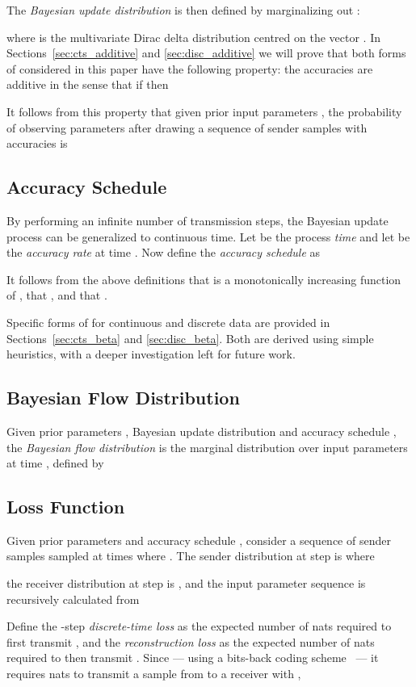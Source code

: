 \documentclass[11pt,table]{article}
\newcommand{\0}[1]{\constvec{0}{#1}}
\newcommand{\1}[1]{\constvec{1}{#1}}
\begin{document}
The \emph{Bayesian update distribution}  is then defined by marginalizing out :

where  is the multivariate Dirac delta distribution centred on the vector .
In Sections~\ref{sec:cts_additive} and \ref{sec:disc_additive} we will prove that both forms of  considered in this paper have the following property: the accuracies are additive in the sense that if  then

It follows from this property that given prior input parameters , the probability of observing parameters  after drawing a sequence of  sender samples  with accuracies  is

\subsection{Accuracy Schedule \texorpdfstring{}{}}
By performing an infinite number of transmission steps, the Bayesian update process can be generalized to continuous time.
Let  be the process \textit{time} and let  be the \emph{accuracy rate} at time .
Now define the \emph{accuracy schedule}  as 

It follows from the above definitions that  is a monotonically increasing function of , that , and that .

Specific forms of  for continuous and discrete data are provided in Sections~\ref{sec:cts_beta} and \ref{sec:disc_beta}. 
Both are derived using simple heuristics, with a deeper investigation left for future work.
\subsection{Bayesian Flow Distribution \texorpdfstring{}{}}
Given prior parameters , Bayesian update distribution  and accuracy schedule , the \emph{Bayesian flow distribution}  is the marginal distribution over input parameters at time , defined by

\subsection{Loss Function \texorpdfstring{}{}}
Given prior parameters  and accuracy schedule , consider a sequence of  sender samples  sampled at times  where . The sender distribution at step  is 
where

the receiver distribution at step  is , 
and the input parameter sequence  is recursively calculated from

Define the -step \textit{discrete-time loss}  as the expected number of nats required to first transmit , and the \textit{reconstruction loss}  as the expected number of nats required to then transmit .
Since --- using a bits-back coding scheme~\citep{hinton1993keeping, duda2009asymmetric} --- it requires  nats to transmit a sample from  to a receiver with ,
\end{document}

